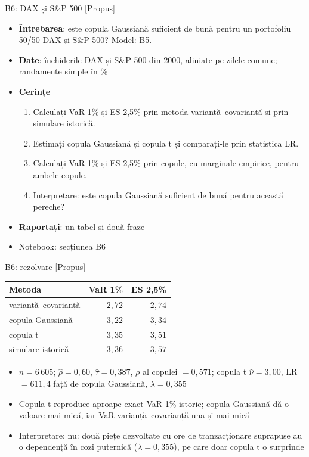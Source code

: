 \begin{frame}{B6: DAX și S\&P 500 [Propus]}
\itemsize{\footnotesize}
\begin{itemize}
\item \textbf{Întrebarea}: este copula Gaussiană suficient de bună pentru un portofoliu 50/50 DAX și S\&P 500? Model: B5.
\item \textbf{Date}: închiderile DAX și S\&P 500 din 2000, aliniate pe zilele comune; randamente simple în \%
\item \textbf{Cerințe}
\begin{enumerate}
    \item Calculați VaR 1\% și ES 2,5\% prin metoda varianță--covarianță și prin simulare istorică.
    \item Estimați copula Gaussiană și copula t și comparați-le prin statistica LR.
    \item Calculați VaR 1\% și ES 2,5\% prin copule, cu marginale empirice, pentru ambele copule.
    \item Interpretare: este copula Gaussiană suficient de bună pentru această pereche?
\end{enumerate}
\item \textbf{Raportați}: un tabel și două fraze
\item Notebook: secțiunea B6
\end{itemize}
\end{frame}

\ifsolutions
\begin{frame}{B6: rezolvare [Propus]}
\itemsize{\footnotesize}
\begin{center}
\footnotesize
\begin{tabular}{lrr}
\toprule
Metoda & VaR 1\% & ES 2,5\% \\
\midrule
varianță--covarianță & $2{,}72$ & $2{,}74$ \\
copula Gaussiană & $3{,}22$ & $3{,}34$ \\
copula t & $3{,}35$ & $3{,}51$ \\
simulare istorică & $3{,}36$ & $3{,}57$ \\
\bottomrule
\end{tabular}
\end{center}
\begin{itemize}
    \item $n = 6\,605$; $\hat\rho = 0{,}60$, $\hat\tau = 0{,}387$, $\rho$ al copulei $= 0{,}571$; copula t $\hat\nu = 3{,}00$, LR $= 611{,}4$ față de copula Gaussiană, $\lambda = 0{,}355$
    \item Copula t reproduce aproape exact VaR 1\% istoric; copula Gaussiană dă o valoare mai mică, iar VaR varianță--covarianță una și mai mică
    \item Interpretare: nu: două piețe dezvoltate cu ore de tranzacționare suprapuse au o dependență în cozi puternică ($\lambda = 0{,}355$), pe care doar copula t o surprinde
\end{itemize}
\end{frame}
\fi


